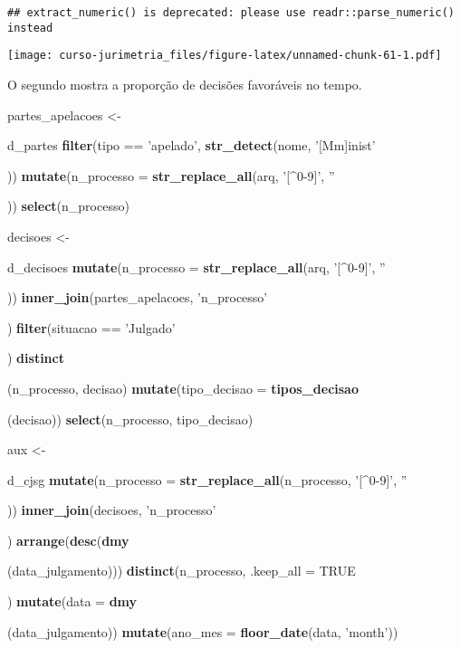 \documentclass[]{book}
\newenvironment{Shaded}{\begin{snugshade}}{\end{snugshade}}
\newcommand{\KeywordTok}[1]{\textcolor[rgb]{0.13,0.29,0.53}{\textbf{{#1}}}}
\newcommand{\DataTypeTok}[1]{\textcolor[rgb]{0.13,0.29,0.53}{{#1}}}
\newcommand{\StringTok}[1]{\textcolor[rgb]{0.31,0.60,0.02}{{#1}}}
\newcommand{\OtherTok}[1]{\textcolor[rgb]{0.56,0.35,0.01}{{#1}}}
\newcommand{\NormalTok}[1]{{#1}}
\begin{document}
\begin{verbatim}
## extract_numeric() is deprecated: please use readr::parse_numeric() instead
\end{verbatim}

\texttt{[image: curso-jurimetria\_files/figure-latex/unnamed-chunk-61-1.pdf]}

O segundo mostra a proporção de decisões favoráveis no tempo.

\begin{Shaded}
\begin{Highlighting}[]
\NormalTok{partes_apelacoes <-}\StringTok{ }\NormalTok{d_partes %>%}\StringTok{ }
\StringTok{  }\KeywordTok{filter}\NormalTok{(tipo ==}\StringTok{ 'apelado'}\NormalTok{, }\KeywordTok{str_detect}\NormalTok{(nome, }\StringTok{'[Mm]inist'}\NormalTok{)) %>%}\StringTok{ }
\StringTok{  }\KeywordTok{mutate}\NormalTok{(}\DataTypeTok{n_processo =} \KeywordTok{str_replace_all}\NormalTok{(arq, }\StringTok{'[^0-9]'}\NormalTok{, }\StringTok{''}\NormalTok{)) %>%}\StringTok{ }
\StringTok{  }\KeywordTok{select}\NormalTok{(n_processo)}
  
\NormalTok{decisoes <-}\StringTok{ }\NormalTok{d_decisoes %>%}\StringTok{ }
\StringTok{  }\KeywordTok{mutate}\NormalTok{(}\DataTypeTok{n_processo =} \KeywordTok{str_replace_all}\NormalTok{(arq, }\StringTok{'[^0-9]'}\NormalTok{, }\StringTok{''}\NormalTok{)) %>%}\StringTok{ }
\StringTok{  }\KeywordTok{inner_join}\NormalTok{(partes_apelacoes, }\StringTok{'n_processo'}\NormalTok{) %>%}\StringTok{ }
\StringTok{  }\KeywordTok{filter}\NormalTok{(situacao ==}\StringTok{ 'Julgado'}\NormalTok{) %>%}\StringTok{ }
\StringTok{  }\KeywordTok{distinct}\NormalTok{(n_processo, decisao) %>%}
\StringTok{  }\KeywordTok{mutate}\NormalTok{(}\DataTypeTok{tipo_decisao =} \KeywordTok{tipos_decisao}\NormalTok{(decisao)) %>%}\StringTok{ }
\StringTok{  }\KeywordTok{select}\NormalTok{(n_processo, tipo_decisao)}
  

\NormalTok{aux <-}\StringTok{ }\NormalTok{d_cjsg %>%}
\StringTok{  }\KeywordTok{mutate}\NormalTok{(}\DataTypeTok{n_processo =} \KeywordTok{str_replace_all}\NormalTok{(n_processo, }\StringTok{'[^0-9]'}\NormalTok{, }\StringTok{''}\NormalTok{)) %>%}\StringTok{ }
\StringTok{  }\KeywordTok{inner_join}\NormalTok{(decisoes, }\StringTok{'n_processo'}\NormalTok{) %>%}\StringTok{ }
\StringTok{  }\KeywordTok{arrange}\NormalTok{(}\KeywordTok{desc}\NormalTok{(}\KeywordTok{dmy}\NormalTok{(data_julgamento))) %>%}\StringTok{ }
\StringTok{  }\KeywordTok{distinct}\NormalTok{(n_processo, }\DataTypeTok{.keep_all =} \OtherTok{TRUE}\NormalTok{) %>%}\StringTok{ }
\StringTok{  }\KeywordTok{mutate}\NormalTok{(}\DataTypeTok{data =} \KeywordTok{dmy}\NormalTok{(data_julgamento)) %>%}
\StringTok{  }\KeywordTok{mutate}\NormalTok{(}\DataTypeTok{ano_mes =} \KeywordTok{floor_date}\NormalTok{(data, }\StringTok{'month'}\NormalTok{))}

}}}}}}}}}}}}}}}
\end{Highlighting}
\end{Shaded}
\end{document}
